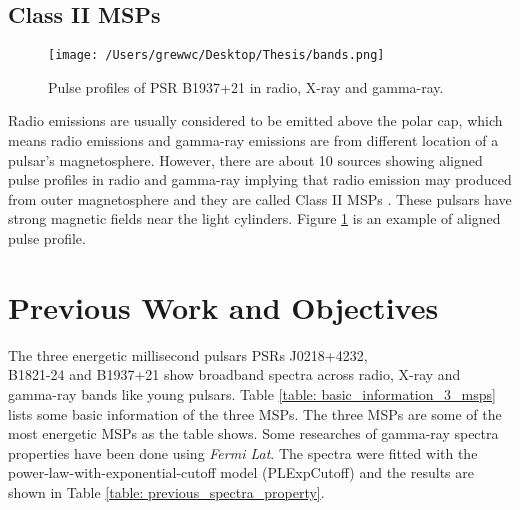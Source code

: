 \documentclass[12pt]{report}
\begin{document}
        \subsection{Class II MSPs}
          \begin{figure}[h]   
            \centering
            \texttt{[image: /Users/grewwc/Desktop/Thesis/bands.png]}
            \caption{Pulse profiles of PSR B1937+21 in radio, X-ray and gamma-ray.
              \protect \cite{0004-637X-787-2-167}}
            \label{fig:class }
          \end{figure}	 
          Radio emissions are usually considered to be emitted above the polar cap, which means
          radio emissions and gamma-ray emissions are from different location of a pulsar's 
          magnetosphere. However, there are about 10 sources showing aligned pulse profiles in 
          radio and gamma-ray implying that radio emission may produced from outer 
          magnetosphere and they are called Class II MSPs \cite{0004-637X-744-1-33}.
          These pulsars have strong magnetic fields near the light cylinders. 
          Figure \ref{fig:class } is an example of aligned pulse profile.

      \section{Previous Work and Objectives}
        The three energetic millisecond pulsars PSRs J0218+4232, \\ 
        B1821-24 and B1937+21 show 
        broadband spectra across radio, X-ray and gamma-ray bands like young pulsars. Table 
        \ref{table: basic_information_3_msps} lists some basic information of the three MSPs. 
        The three MSPs are some of the most energetic MSPs as the table shows. Some researches
        of gamma-ray spectra properties have been done using \textit{Fermi Lat}. The spectra were 
        fitted with the power-law-with-exponential-cutoff model (PLExpCutoff) and the results 
        are shown in Table \ref{table: previous_spectra_property}. 
\end{document}
